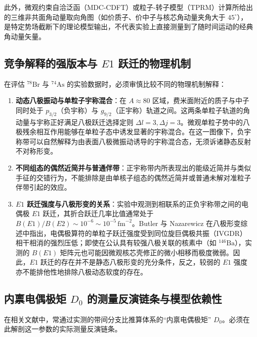 此外，微观约束自洽泛函（MDC-CDFT）或粒子-转子模型（TPRM）计算所给出的三维非共面角动量取向角图（如价质子、价中子与核芯角动量夹角大于 $45^\circ$），是特定势场截断下的理论模型输出，不代表实验上直接测量到了随时间运动的经典角动量矢量。

\subsection{竞争解释的强版本与 $E1$ 跃迁的物理机制}\label{sec:4-5-4}

在评估 $^{78}\mathrm{Br}$ 与 $^{74}\mathrm{As}$ 的实验数据时，必须审慎比较不同的物理机制解释：
\begin{enumerate}
\item \textbf{动态八极振动与单粒子宇称混合}：在 $A \approx 80$ 区域，费米面附近的质子与中子同时处于 $p_{3/2}$（负宇称）与 $g_{9/2}$（正宇称）轨道之间。这两条单粒子轨道的角动量与宇称正好满足八极跃迁选择定则 $\Delta l = 3, \Delta j = 3$。微观单粒子势中的八极残余相互作用能够在单粒子态中诱发显著的宇称混合。在这一图像下，负宇称带可以自然解释为由表面八极微振动诱导的宇称混合态，无须诉诸静态反射不对称形变。
\item \textbf{不同组态的偶然近简并与普通伴带}：正宇称带内所表现出的能级近简并与类似手征的交错行为，不能排除是由单核子组态的偶然近简并或普通未解对准粒子伴带引起的效应。
\item \textbf{$E1$ 跃迁强度与八极形变的关系}：实验中观测到相联系的正负宇称带之间的电偶极 $E1$ 跃迁，其折合跃迁几率比值通常处于 $B(E1)/B(E2) \sim 10^{-6}\sim 10^{-5}\,\mathrm{fm}^{-2}$。Butler 与 Nazarewicz 在八极形变综述中指出，电偶极算符的单粒子跃迁强度受到同位旋巨偶极共振（IVGDR）相干相消的强烈压低；即使在公认具有较强八极关联的核素中（如 $^{146}\mathrm{Ba}$），实测的 $B(E1)$ 矩阵元也可能因微观核芯壳修正的微小相移而极度微弱。因此，$E1$ 跃迁的存在并不是静态八极形变的充分条件，反之，较弱的 $E1$ 强度亦不能排他性地排除八极动态软度的存在。\cite{butler_1996_octupole_shapes}
\end{enumerate}

\subsection{内禀电偶极矩 $D_0$ 的测量反演链条与模型依赖性}\label{sec:4-5-5}

在相关文献中，常通过实测的带间分支比推算体系的“内禀电偶极矩” $D_0$。必须在此解剖这一参数的实际测量反演链条。

